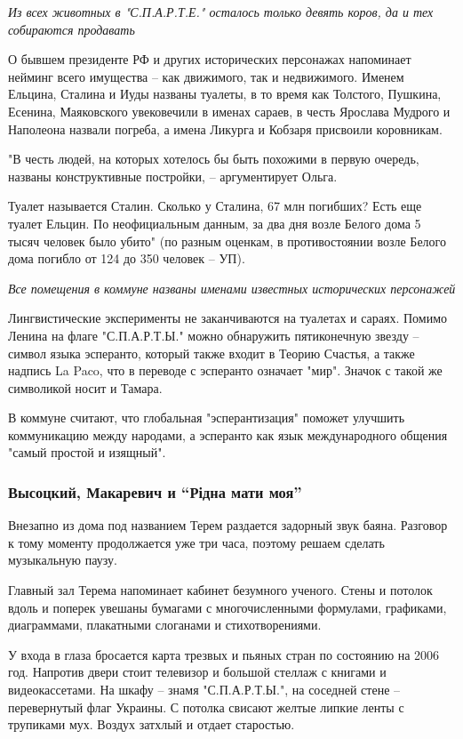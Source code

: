 {\em
Из всех животных в "С.П.А.Р.Т.Е." осталось только девять коров, да и тех собираются продавать
\/}

О бывшем президенте РФ и других исторических персонажах напоминает нейминг
всего имущества – как движимого, так и недвижимого. Именем Ельцина, Сталина и
Иуды названы туалеты, в то время как Толстого, Пушкина, Есенина, Маяковского
увековечили в именах сараев, в честь Ярослава Мудрого и Наполеона назвали
погреба, а имена Ликурга и Кобзаря присвоили коровникам.

"В честь людей, на которых хотелось бы быть похожими в первую очередь, названы
конструктивные постройки, – аргументирует Ольга.

Туалет называется Сталин. Сколько у Сталина, 67 млн погибших? Есть еще туалет
Ельцин. По неофициальным данным, за два дня возле Белого дома 5 тысяч человек
было убито" (по разным оценкам, в противостоянии возле Белого дома погибло от
124 до 350 человек – УП).

\emph{Все помещения в коммуне названы именами известных исторических персонажей}

Лингвистические эксперименты не заканчиваются на туалетах и сараях. Помимо
Ленина на флаге "С.П.А.Р.Т.Ы." можно обнаружить пятиконечную звезду – символ
языка эсперанто, который также входит в Теорию Счастья, а также надпись La
Paco, что в переводе с эсперанто означает "мир". Значок с такой же символикой
носит и Тамара.

В коммуне считают, что глобальная "эсперантизация" поможет улучшить
коммуникацию между народами, а эсперанто как язык международного общения "самый
простой и изящный".

\subsubsection{Высоцкий, Макаревич и ``Рідна мати моя''}

Внезапно из дома под названием Терем раздается задорный звук баяна. Разговор к
тому моменту продолжается уже три часа, поэтому решаем сделать музыкальную
паузу.

Главный зал Терема напоминает кабинет безумного ученого. Стены и потолок вдоль
и поперек увешаны бумагами с многочисленными формулами, графиками, диаграммами,
плакатными слоганами и стихотворениями. 

У входа в глаза бросается карта трезвых и пьяных стран по состоянию на 2006
год. Напротив двери стоит телевизор и большой стеллаж с книгами и
видеокассетами. На шкафу – знамя "С.П.А.Р.Т.Ы.", на соседней стене –
перевернутый флаг Украины. С потолка свисают желтые липкие ленты с трупиками
мух. Воздух затхлый и отдает старостью.

